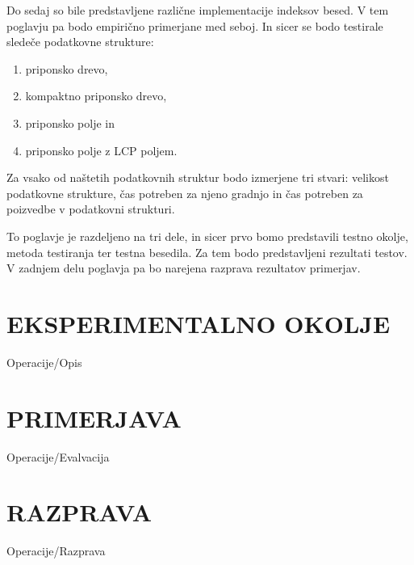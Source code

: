 Do sedaj so bile predstavljene različne implementacije indeksov besed. V tem poglavju pa bodo  empirično primerjane med seboj. In sicer se bodo testirale sledeče podatkovne strukture:
\begin{enumerate}
        \item priponsko drevo, %
        \item kompaktno priponsko drevo, 
        \item priponsko polje in 
        \item priponsko polje z LCP poljem.
\end{enumerate}
Za vsako od naštetih podatkovnih struktur bodo izmerjene tri stvari: velikost podatkovne strukture, čas potreben za njeno gradnjo in čas potreben za poizvedbe v podatkovni strukturi.

To poglavje je razdeljeno na tri dele, in sicer prvo bomo predstavili testno okolje, metoda testiranja ter testna besedila. Za tem bodo predstavljeni rezultati testov. V zadnjem delu poglavja pa bo narejena razprava rezultatov primerjav.

\section{EKSPERIMENTALNO OKOLJE}\label{sec:opis}
{Operacije/Opis}


\section{PRIMERJAVA}\label{sec:primerjava}
{Operacije/Evalvacija}

\section{RAZPRAVA}\label{sec:razprava}
{Operacije/Razprava}